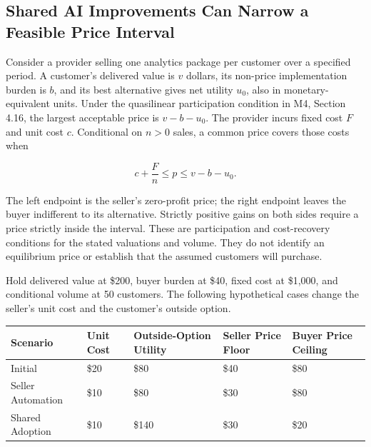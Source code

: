 \hypertarget{M08-shared-ai-improvements-can-narrow-a-feasible-price-interval}{%
\subsection{Shared AI Improvements Can Narrow a Feasible Price
Interval}\label{M08-shared-ai-improvements-can-narrow-a-feasible-price-interval}}

\noindent \noindent Consider a provider selling one analytics package per customer
over a specified period. A customer's delivered value is \(v\) dollars,
its non-price implementation burden is \(b\), and its best alternative
gives net utility \(u_0\), also in monetary-equivalent units. Under the
quasilinear participation condition in M4, Section 4.16, the largest
acceptable price is \(v-b-u_0\). The provider incurs fixed cost \(F\)
and unit cost \(c\). Conditional on \(n>0\) sales, a common price covers
those costs when

\[
c+\frac{F}{n}\leq p\leq v-b-u_0.
\]

The left endpoint is the seller's zero-profit price; the right endpoint
leaves the buyer indifferent to its alternative. Strictly positive gains
on both sides require a price strictly inside the interval. These are
participation and cost-recovery conditions for the stated valuations and
volume. They do not identify an equilibrium price or establish that the
assumed customers will purchase.

Hold delivered value at \$200, buyer burden at \$40, fixed cost at
\$1,000, and conditional volume at 50 customers. The following
hypothetical cases change the seller's unit cost and the customer's
outside option.

\begin{table}[H]
\centering\small
\begin{tabular}{@{}
  >{\raggedright\arraybackslash}p{}
  >{\raggedleft\arraybackslash}p{}
  >{\raggedleft\arraybackslash}p{}
  >{\raggedleft\arraybackslash}p{}
  >{\raggedleft\arraybackslash}p{}@{}}
\toprule
Scenario & Unit Cost & Outside-Option Utility & Seller Price Floor &
Buyer Price Ceiling \\
\midrule

Initial & \$20 & \$80 & \$40 & \$80 \\
Seller Automation & \$10 & \$80 & \$30 & \$80 \\
Shared Adoption & \$10 & \$140 & \$30 & \$20 \\
\bottomrule
\end{tabular}
\end{table}


